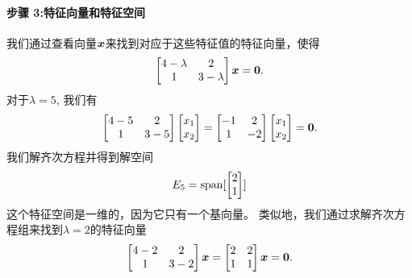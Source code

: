 \begin{example}
    \paragraph{步骤 3:特征向量和特征空间}
    我们通过查看向量$\boldsymbol{x}$来找到对应于这些特征值的特征向量，使得
    \begin{equation}
        \begin{bmatrix}
            4-\lambda & 2 \\
            1 & 3-\lambda
        \end{bmatrix}
        \boldsymbol{x} = \boldsymbol{0}.
    \end{equation}
    对于$\lambda = 5$, 我们有
    \begin{equation}
        \begin{bmatrix}
            4 - 5 & 2 \\
            1 & 3 - 5
        \end{bmatrix}
        \begin{bmatrix}
            x_1 \\ x_2
        \end{bmatrix}
        =
        \begin{bmatrix}
            -1 & 2 \\
            1 & -2
        \end{bmatrix}
        \begin{bmatrix}
            x_1 \\ x_2
        \end{bmatrix}
        = \boldsymbol{0}.
    \end{equation}
    我们解齐次方程并得到解空间
    \begin{equation}
        E_5 = \mathrm{span}[
        \begin{bmatrix}
            2 \\ 1
        \end{bmatrix}]
    \end{equation}
    这个特征空间是一维的，因为它只有一个基向量。
    类似地，我们通过求解齐次方程组来找到$\lambda = 2$的特征向量
    \begin{equation}
        \begin{bmatrix}
            4-2 & 2 \\
            1 & 3-2
        \end{bmatrix}
        \boldsymbol{x} =
        \begin{bmatrix}
            2 & 2 \\
            1 & 1
        \end{bmatrix}
        \boldsymbol{x} = \boldsymbol{0}.
    \end{equation}

\end{example}
